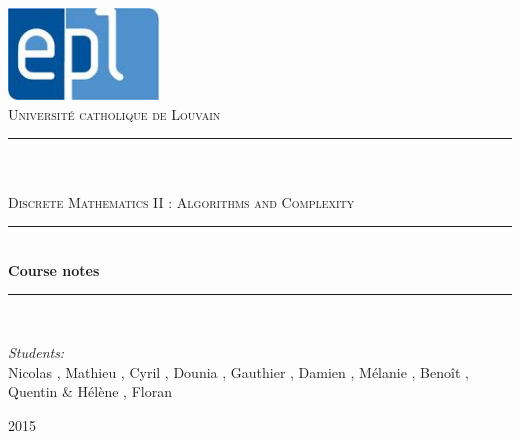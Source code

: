 \newcommand{\HRule}{\rule{\linewidth}{0.5mm}}

\begin{titlepage}
	
\begin{center}

\includegraphics[width=0.30\textwidth]{images/epl.jpg}\\[1cm]    

\textsc{\LARGE Universit\'e catholique de Louvain}\\[1.5cm]

\HRule \\[0.5cm]

\textsc{\Large {}}\\[0.2cm]
\textsc{\Large Discrete Mathematics II : Algorithms and Complexity}\\[0.5cm]


\HRule \\[2cm]
{\huge \bfseries Course notes}\\[1cm]

\HRule \\[1.5cm]

\begin{minipage}{0.8\textwidth}
\begin{flushleft} \large
\emph{Students:}\\
Nicolas , Mathieu , Cyril , Dounia , Gauthier , Damien , M\'elanie , Beno\^it , Quentin   \& H\'el\`ene , Floran 
\emph{}



\end{flushleft}
\end{minipage}


\vfill

{\large  2015}

\end{center}	
	
	
\end{titlepage}
